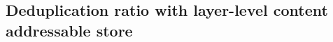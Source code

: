 \subsection{Deduplication ratio with layer-level content addressable store}
\label{sec:dedup_layerCAS}

